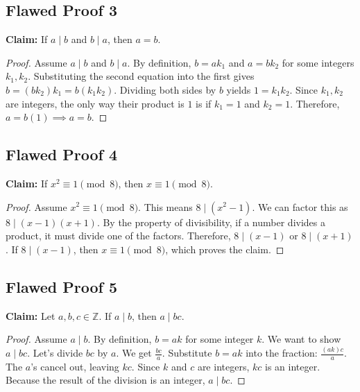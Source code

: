 \documentclass[11pt]{article}
\theoremstyle{definition}
\theoremstyle{remark}
\newcommand{\Z}{\mathbb{Z}}
\begin{document}
\subsection{Flawed Proof 3}
\textbf{Claim:} If $a \mid b$ and $b \mid a$, then $a = b$.
\begin{proof}
Assume $a \mid b$ and $b \mid a$. By definition, $b = ak_1$ and $a = bk_2$ for some integers $k_1, k_2$. Substituting the second equation into the first gives $b = (bk_2)k_1 = b(k_1 k_2)$. Dividing both sides by $b$ yields $1 = k_1 k_2$. Since $k_1, k_2$ are integers, the only way their product is $1$ is if $k_1 = 1$ and $k_2 = 1$. Therefore, $a = b(1) \implies a = b$.
\end{proof}

\subsection{Flawed Proof 4}
\textbf{Claim:} If $x^2 \equiv 1 \pmod 8$, then $x \equiv 1 \pmod 8$.
\begin{proof}
Assume $x^2 \equiv 1 \pmod 8$. This means $8 \mid (x^2 - 1)$. We can factor this as $8 \mid (x-1)(x+1)$. By the property of divisibility, if a number divides a product, it must divide one of the factors. Therefore, $8 \mid (x-1)$ or $8 \mid (x+1)$. If $8 \mid (x-1)$, then $x \equiv 1 \pmod 8$, which proves the claim.
\end{proof}

\subsection{Flawed Proof 5}
\textbf{Claim:} Let $a, b, c \in \Z$. If $a \mid b$, then $a \mid bc$.
\begin{proof}
Assume $a \mid b$. By definition, $b = ak$ for some integer $k$. We want to show $a \mid bc$. Let's divide $bc$ by $a$. We get $\frac{bc}{a}$. Substitute $b = ak$ into the fraction: $\frac{(ak)c}{a}$. The $a$'s cancel out, leaving $kc$. Since $k$ and $c$ are integers, $kc$ is an integer. Because the result of the division is an integer, $a \mid bc$.
\end{proof}

\newpage
\end{document}
